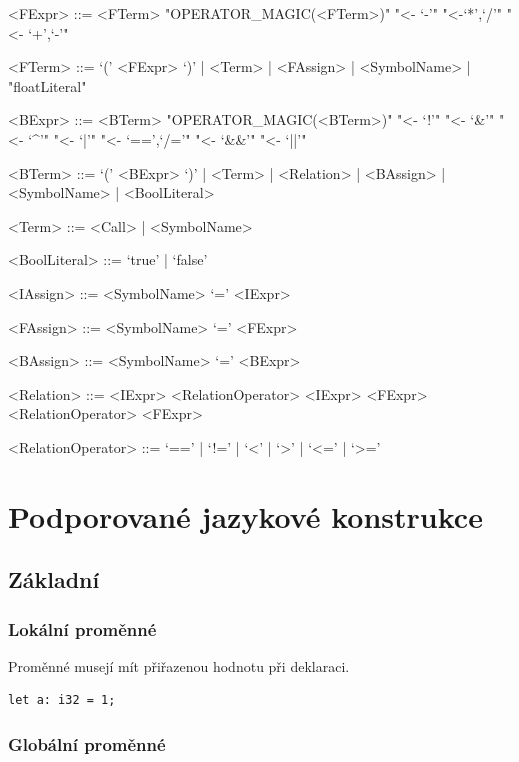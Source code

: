 \documentclass[12pt,a4paper]{article}
\begin{document}
\begin{grammar}
<FExpr> ::= <FTerm>
\alt "OPERATOR_MAGIC(<FTerm>)" "<- `-'" "<-`*',`/'" "<- `+',`-'"

<FTerm> ::= `(' <FExpr> `)' | <Term> | <FAssign> | <SymbolName> | "floatLiteral"

<BExpr> ::= <BTerm>
\alt "OPERATOR_MAGIC(<BTerm>)" "<- `!'" "<- `&'" "<- `^'" "<- `|'" "<- `==',`/='" "<- `&&'" "<- `||'" 

<BTerm> ::= `(' <BExpr> `)' | <Term> | <Relation> | <BAssign> | <SymbolName> | <BoolLiteral>

<Term> ::= <Call> | <SymbolName>

<BoolLiteral> ::= `true' | `false'

<IAssign> ::= <SymbolName> `=' <IExpr>

<FAssign> ::= <SymbolName> `=' <FExpr>

<BAssign> ::= <SymbolName> `=' <BExpr>

<Relation> ::= <IExpr> <RelationOperator> <IExpr>
\alt <FExpr> <RelationOperator> <FExpr>

<RelationOperator> ::= `==' | `!=' | `<' | `>' | `<=' | `>='

\end{grammar}


\section{Podporované jazykové konstrukce}

\subsection{Základní}

\subsubsection*{Lokální proměnné}
Proměnné musejí mít přiřazenou hodnotu při deklaraci.
\begin{verbatim}
let a: i32 = 1;
\end{verbatim}

\subsubsection*{Globální proměnné}
\end{document}
